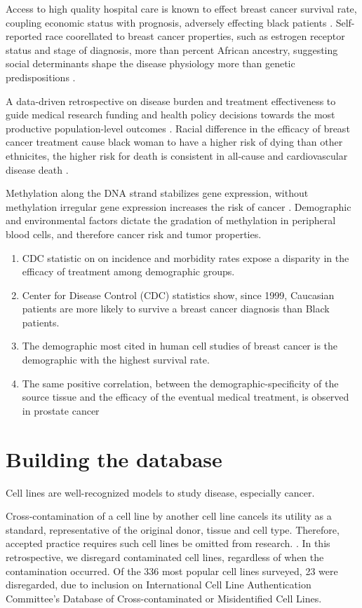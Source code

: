 \documentclass[11pt]{article}
\begin{document}
Access to high quality hospital care is known to effect breast cancer survival rate, coupling economic status with prognosis, adversely effecting black patients \cite{shavers2003racial}.  Self-reported race coorellated to breast cancer properties, such as estrogen receptor status and stage of diagnosis, more than percent African ancestry, suggesting social determinants shape the disease physiology more than genetic predispositions \cite{reding2012examination}.

A data-driven retrospective on disease burden and treatment effectiveness to guide medical research funding and health policy decisions towards the most productive population-level outcomes \cite{kim2016cancer}. 
 Racial difference in the efficacy of breast cancer treatment cause black woman to have a higher risk of dying than other ethnicites, the higher risk for death is consistent in all-cause and cardiovascular disease death \cite{berkman2014racial}.
 
Methylation along the DNA strand stabilizes gene expression, without methylation irregular gene expression increases the risk of cancer  \cite{zhang2011significant}. Demographic and environmental factors dictate the gradation of methylation in peripheral blood cells, and therefore cancer risk and tumor properties. 


\begin{enumerate}
\item CDC statistic on on incidence and morbidity rates expose a disparity in the efficacy of treatment among demographic groups. 
\item Center for Disease Control (CDC) statistics show, since 1999, Caucasian patients are more likely to survive a breast cancer diagnosis than Black patients. 
\item The demographic most cited in human cell studies of breast cancer is the demographic with the highest survival rate. 
\item The same positive correlation, between the demographic-specificity of the source tissue and the efficacy of the eventual medical treatment, is observed in prostate cancer
\end{enumerate}

\section{Building the database}
Cell lines are well-recognized models to study disease, especially cancer. 

Cross-contamination of a cell line by another cell line cancels its utility as a standard, representative of the original donor, tissue and cell type. Therefore, accepted practice requires such cell lines be omitted from research. \cite{capes2010check}. In this retrospective, we disregard contaminated cell lines, regardless of when the contamination occurred. Of the 336 most popular cell lines surveyed, 23 were disregarded, due to inclusion on International Cell Line Authentication Committee's Database of Cross-contaminated or Misidentified Cell Lines. 
\end{document}
